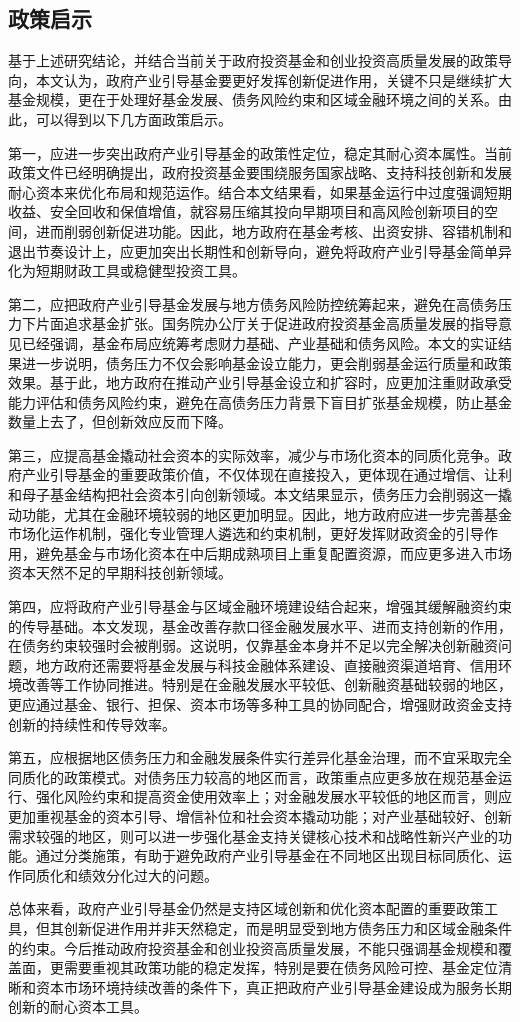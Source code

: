 \subsection{政策启示}

基于上述研究结论，并结合当前关于政府投资基金和创业投资高质量发展的政策导向，本文认为，政府产业引导基金要更好发挥创新促进作用，关键不只是继续扩大基金规模，更在于处理好基金发展、债务风险约束和区域金融环境之间的关系。由此，可以得到以下几方面政策启示。

第一，应进一步突出政府产业引导基金的政策性定位，稳定其耐心资本属性。当前政策文件已经明确提出，政府投资基金要围绕服务国家战略、支持科技创新和发展耐心资本来优化布局和规范运作。结合本文结果看，如果基金运行中过度强调短期收益、安全回收和保值增值，就容易压缩其投向早期项目和高风险创新项目的空间，进而削弱创新促进功能。因此，地方政府在基金考核、出资安排、容错机制和退出节奏设计上，应更加突出长期性和创新导向，避免将政府产业引导基金简单异化为短期财政工具或稳健型投资工具。

第二，应把政府产业引导基金发展与地方债务风险防控统筹起来，避免在高债务压力下片面追求基金扩张。国务院办公厅关于促进政府投资基金高质量发展的指导意见已经强调，基金布局应统筹考虑财力基础、产业基础和债务风险。本文的实证结果进一步说明，债务压力不仅会影响基金设立能力，更会削弱基金运行质量和政策效果。基于此，地方政府在推动产业引导基金设立和扩容时，应更加注重财政承受能力评估和债务风险约束，避免在高债务压力背景下盲目扩张基金规模，防止基金数量上去了，但创新效应反而下降。

第三，应提高基金撬动社会资本的实际效率，减少与市场化资本的同质化竞争。政府产业引导基金的重要政策价值，不仅体现在直接投入，更体现在通过增信、让利和母子基金结构把社会资本引向创新领域。本文结果显示，债务压力会削弱这一撬动功能，尤其在金融环境较弱的地区更加明显。因此，地方政府应进一步完善基金市场化运作机制，强化专业管理人遴选和约束机制，更好发挥财政资金的引导作用，避免基金与市场化资本在中后期成熟项目上重复配置资源，而应更多进入市场资本天然不足的早期科技创新领域。

第四，应将政府产业引导基金与区域金融环境建设结合起来，增强其缓解融资约束的传导基础。本文发现，基金改善存款口径金融发展水平、进而支持创新的作用，在债务约束较强时会被削弱。这说明，仅靠基金本身并不足以完全解决创新融资问题，地方政府还需要将基金发展与科技金融体系建设、直接融资渠道培育、信用环境改善等工作协同推进。特别是在金融发展水平较低、创新融资基础较弱的地区，更应通过基金、银行、担保、资本市场等多种工具的协同配合，增强财政资金支持创新的持续性和传导效率。

第五，应根据地区债务压力和金融发展条件实行差异化基金治理，而不宜采取完全同质化的政策模式。对债务压力较高的地区而言，政策重点应更多放在规范基金运行、强化风险约束和提高资金使用效率上；对金融发展水平较低的地区而言，则应更加重视基金的资本引导、增信补位和社会资本撬动功能；对产业基础较好、创新需求较强的地区，则可以进一步强化基金支持关键核心技术和战略性新兴产业的功能。通过分类施策，有助于避免政府产业引导基金在不同地区出现目标同质化、运作同质化和绩效分化过大的问题。

总体来看，政府产业引导基金仍然是支持区域创新和优化资本配置的重要政策工具，但其创新促进作用并非天然稳定，而是明显受到地方债务压力和区域金融条件的约束。今后推动政府投资基金和创业投资高质量发展，不能只强调基金规模和覆盖面，更需要重视其政策功能的稳定发挥，特别是要在债务风险可控、基金定位清晰和资本市场环境持续改善的条件下，真正把政府产业引导基金建设成为服务长期创新的耐心资本工具。